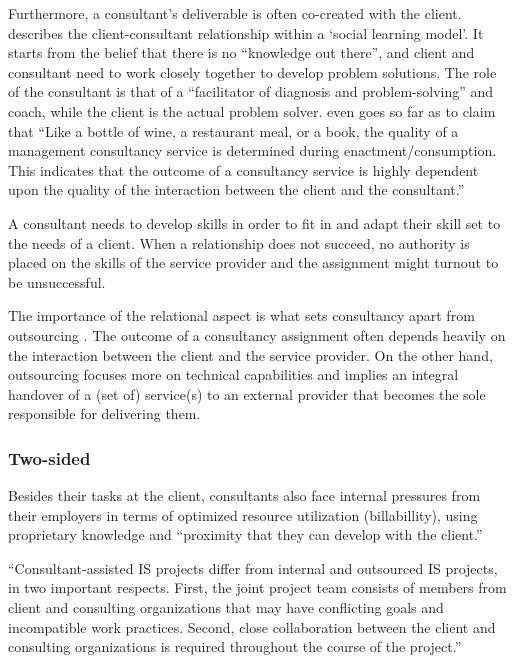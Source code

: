 \documentclass[12pt]{article}
\begin{document}
Furthermore, a consultant's deliverable is often co-created with the
client. \citet[290-297]{nikolova2009} describes the client-consultant
relationship within a `social learning model'. It starts from the belief
that there is no ``knowledge out there'', and client and consultant need
to work closely together to develop problem solutions. The role of the
consultant is that of a ``facilitator of diagnosis and problem-solving''
and coach, while the client is the actual problem solver.
\citet[22]{clark1998} even goes so far as to claim that ``Like a bottle
of wine, a restaurant meal, or a book, the quality of a management
consultancy service is determined during enactment/consumption. This
indicates that the outcome of a consultancy service is highly dependent
upon the quality of the interaction between the client and the
consultant.''

A consultant needs to develop skills in order to fit in and adapt their
skill set to the needs of a client. When a relationship does not
succeed, no authority is placed on the skills of the service provider
\citep[ 10]{furusten2000} and the assignment might turnout to be
unsuccessful.

The importance of the relational aspect is what sets consultancy apart
from outsourcing \citep[ 171-173]{kipping2012}. The outcome of a
consultancy assignment often depends heavily on the interaction between
the client and the service provider. On the other hand, outsourcing
focuses more on technical capabilities and implies an integral handover
of a (set of) service(s) to an external provider that becomes the sole
responsible for delivering them.

\hypertarget{two-sided}{%
\subsubsection{Two-sided}\label{two-sided}}

Besides their tasks at the client, consultants also face internal
pressures from their employers in terms of optimized resource
utilization (billabillity), using proprietary knowledge and ``proximity
that they can develop with the client.'' \citet[138]{chowdhury2021}

``Consultant-assisted IS projects differ from internal and outsourced IS
projects, in two important respects. First, the joint project team
consists of members from client and consulting organizations that may
have conflicting goals and incompatible work practices. Second, close
collaboration between the client and consulting organizations is
required throughout the course of the project.''
\citet[255]{liberatore2010}
\end{document}
